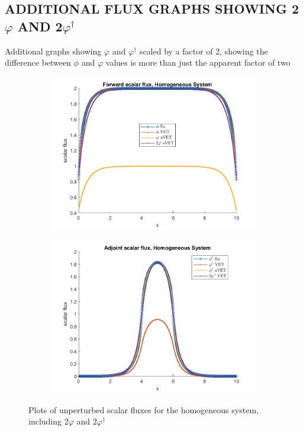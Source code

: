 \documentclass[12pt]{report}
\begin{document}
\begin{appendices}
\chapter{ \uppercase{Additional Flux Graphs showing 2$\varphi$ and 2$\varphi^\dag$}} \label{chap:appx3}
Additional graphs showing $\varphi$ and $\varphi^\dag$ scaled by a factor of 2, showing the difference between $\phi$ and $\varphi$ values is more than just the apparent factor of two
\begin{figure}[H]
\centering
\begin{subfigure}{.5\textwidth}
  \centering
  \includegraphics[width=.98\linewidth]{figures2/22phi2.png}
\end{subfigure}%
\begin{subfigure}{.5\textwidth}
  \centering
  \includegraphics[width=.98\linewidth]{figures2/22phia2.png}
\end{subfigure}
\caption{Plots of unperturbed scalar fluxes for the homogeneous system, including $2\varphi$ and $2\varphi^\dag$ }
\label{fig:2Flux1}
\end{figure}


\end{appendices}
\end{document}
